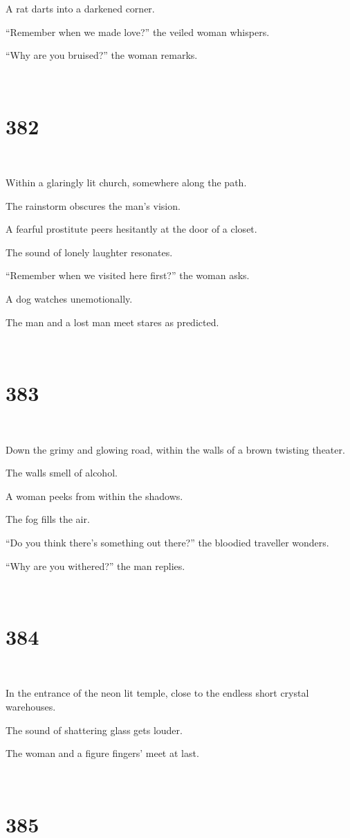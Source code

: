 \documentclass{report}
\begin{document}
A rat darts into a darkened corner.

``Remember when we made love?'' the veiled woman whispers.

``Why are you bruised?'' the woman remarks.

~
\chapter*{382}
~

Within a glaringly lit church, somewhere along the path.

The rainstorm obscures the man's vision.

A fearful prostitute peers hesitantly at the door of a closet.

The sound of lonely laughter resonates.

``Remember when we visited here first?'' the woman asks.

A dog watches unemotionally.

The man and a lost man meet stares as predicted.

~
\chapter*{383}
~

Down the grimy and glowing road, within the walls of a brown twisting theater.

The walls smell of alcohol.

A woman peeks from within the shadows.

The fog fills the air.

``Do you think there's something out there?'' the bloodied traveller wonders.

``Why are you withered?'' the man replies.

~
\chapter*{384}
~

In the entrance of the neon lit temple, close to the endless short crystal warehouses.

The sound of shattering glass gets louder.

The woman and a figure fingers' meet at last.

~
\chapter*{385}
~
\end{document}
